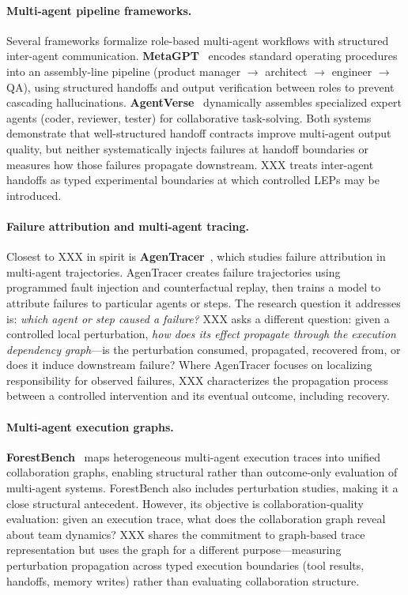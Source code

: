 \paragraph{Multi-agent pipeline frameworks.}
Several frameworks formalize role-based multi-agent workflows with structured
inter-agent communication. \textbf{MetaGPT}~\citep{hong2023metagpt} encodes
standard operating procedures into an assembly-line pipeline (product
manager $\to$ architect $\to$ engineer $\to$ QA), using structured handoffs
and output verification between roles to prevent cascading hallucinations.
\textbf{AgentVerse}~\citep{chen2023agentverse} dynamically assembles
specialized expert agents (coder, reviewer, tester) for collaborative
task-solving. Both systems demonstrate that well-structured handoff contracts
improve multi-agent output quality, but neither systematically injects
failures at handoff boundaries or measures how those failures propagate
downstream. XXX treats inter-agent handoffs as typed experimental boundaries
at which controlled LEPs may be introduced.

\paragraph{Failure attribution and multi-agent tracing.}
Closest to XXX in spirit is \textbf{AgenTracer}~\citep{XXXX}, which
studies failure attribution in multi-agent trajectories. AgenTracer creates
failure trajectories using programmed fault injection and counterfactual
replay, then trains a model to attribute failures to particular agents or
steps. The research question it addresses is: \emph{which agent or step
caused a failure?} XXX asks a different question: given a controlled
local perturbation, \emph{how does its effect propagate through the
execution dependency graph}---is the perturbation consumed, propagated,
recovered from, or does it induce downstream failure? Where AgenTracer
focuses on localizing responsibility for observed failures, XXX
characterizes the propagation process between a controlled intervention
and its eventual outcome, including recovery.

\paragraph{Multi-agent execution graphs.}
\textbf{ForestBench}~\citep{XXXX} maps heterogeneous multi-agent execution
traces into unified collaboration graphs, enabling structural rather than
outcome-only evaluation of multi-agent systems. ForestBench also includes
perturbation studies, making it a close structural antecedent. However, its
objective is collaboration-quality evaluation: given an execution trace,
what does the collaboration graph reveal about team dynamics? XXX shares
the commitment to graph-based trace representation but uses the graph for
a different purpose---measuring perturbation propagation across typed
execution boundaries (tool results, handoffs, memory writes) rather than
evaluating collaboration structure.

